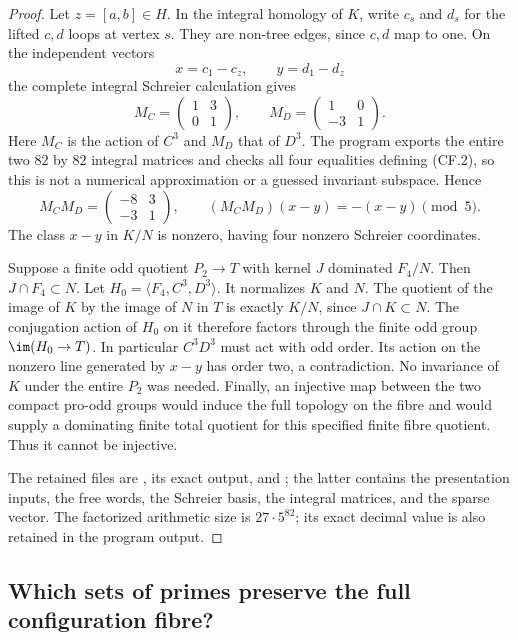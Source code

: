 \begin{proof}
Let $z=[a,b]\in H$. In the integral homology of $K$, write $c_s$
and $d_s$ for the lifted $c,d$ loops at vertex $s$. They are non-tree
edges, since $c,d$ map to one. On the independent vectors
\[
                 x=c_1-c_z,\qquad y=d_1-d_z
\]
the complete integral Schreier calculation gives
\[
 M_C=\begin{pmatrix}1&3\\0&1\end{pmatrix},\qquad
 M_D=\begin{pmatrix}1&0\\-3&1\end{pmatrix}.                    \tag{CF.2}
\]
Here $M_C$ is the action of $C^3$ and $M_D$ that of $D^3$.
The program exports the entire two $82$ by $82$ integral matrices
and checks all four equalities defining (CF.2), so this is not a
numerical approximation or a guessed invariant subspace. Hence
\[
 M_CM_D=\begin{pmatrix}-8&3\\-3&1\end{pmatrix},\qquad
 (M_CM_D)(x-y)=-(x-y)\pmod5.
\]
The class $x-y$ in $K/N$ is nonzero, having four nonzero Schreier
coordinates.

Suppose a finite odd quotient $P_2\to T$ with kernel $J$ dominated
$F_4/N$. Then $J\cap F_4\subset N$. Let
$H_0=\langle F_4,C^3,D^3\rangle$. It normalizes $K$ and $N$.
The quotient of the image of $K$ by the image of $N$ in $T$ is
exactly $K/N$, since $J\cap K\subset N$. The conjugation action of
$H_0$ on it therefore factors through the finite odd group
$\im(H_0\to T)$. In particular $C^3D^3$ must act with odd order.
Its action on the nonzero line generated by $x-y$ has order two,
a contradiction. No invariance of $K$ under the entire $P_2$ was
needed. Finally, an injective map between the two compact pro-odd
groups would induce the full topology on the fibre and would supply
a dominating finite total quotient for this specified finite fibre
quotient. Thus it cannot be injective.

The retained files are
, its exact output, and
; the latter
contains the presentation inputs, the free words, the Schreier basis,
the integral matrices, and the sparse vector. The factorized arithmetic size is $27\cdot5^{82}$; its exact decimal
value is also retained in the program output.
\end{proof}

\subsection{Which sets of primes preserve the full configuration fibre?}

